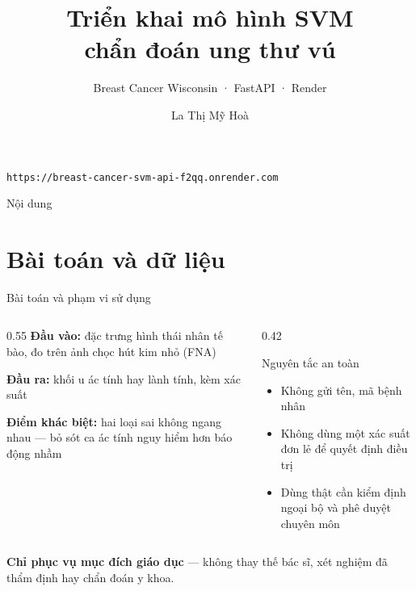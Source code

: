 \documentclass[aspectratio=169,12pt]{beamer}
\title[SVM chẩn đoán ung thư vú]{Triển khai mô hình SVM\\chẩn đoán ung thư vú}
\subtitle{Breast Cancer Wisconsin · FastAPI · Render}
\author{La Thị Mỹ Hoà}
\institute{Lớp 24CKDL \\ Học phần: Học máy nâng cao}
\date{}
\newcommand{\canhbao}{%
  \colorbox{warnbg}{\parbox{0.96\textwidth}{\small\textbf{Chỉ phục vụ mục đích giáo dục} --- không thay thế
  bác sĩ, xét nghiệm đã thẩm định hay chẩn đoán y khoa.}}}
\begin{document}
\begin{frame}[plain]
  \titlepage
  \begin{center}\small
    \texttt{https://breast-cancer-svm-api-f2qq.onrender.com}
  \end{center}
\end{frame}

\begin{frame}{Nội dung}
  \tableofcontents
\end{frame}

\section{Bài toán và dữ liệu}

\begin{frame}{Bài toán và phạm vi sử dụng}
  \begin{columns}[T]
    \begin{column}{0.55\textwidth}
      \textbf{Đầu vào:} \NFeatures{} đặc trưng hình thái nhân tế bào, đo trên ảnh chọc hút kim nhỏ (FNA)
      \vspace{6pt}

      \textbf{Đầu ra:} khối u \alert{ác tính} hay lành tính, kèm xác suất
      \vspace{6pt}

      \textbf{Điểm khác biệt:} hai loại sai không ngang nhau --- bỏ sót ca ác tính nguy hiểm hơn báo động nhầm
    \end{column}
    \begin{column}{0.42\textwidth}
      \begin{block}{Nguyên tắc an toàn}
        \small
        \begin{itemize}
          \item Không gửi tên, mã bệnh nhân
          \item Không dùng một xác suất đơn lẻ để quyết định điều trị
          \item Dùng thật cần kiểm định ngoại bộ và phê duyệt chuyên môn
        \end{itemize}
      \end{block}
    \end{column}
  \end{columns}
  \vfill
  \canhbao
\end{frame}
\end{document}
